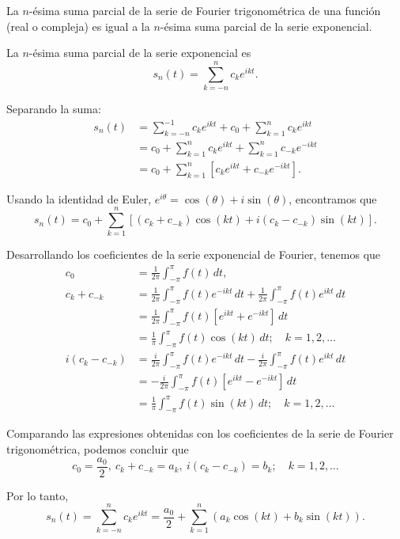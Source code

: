 \begin{propo} \label{TrigoExpo}
La $n$-ésima suma parcial de la serie de Fourier trigonométrica de una función (real o compleja) es igual a la $n$-ésima suma parcial de la serie exponencial.
\end{propo}

\begin{demo}
La $n$-ésima suma parcial de la serie exponencial es
$$ s_n(t) = \sum_{k=-n}^n c_k e^{ikt}.$$

Separando la suma:
\begin{align*}
    s_n(t) &= \sum_{k=-n}^{-1} c_k e^{ikt} + c_0 + \sum_{k=1}^n c_k e^{ikt} \\
    &= c_0 + \sum_{k=1}^n c_k e^{ikt} + \sum_{k=1}^n c_{-k} e^{-ikt} \\
    &= c_0 + \sum_{k=1}^n [c_k e^{ikt} + c_{-k} e^{-ikt}]. 
\end{align*}

Usando la identidad de Euler, $e^{i\theta} = \cos(\theta) + i \sin(\theta)$, encontramos que
$$s_n(t) = c_0 +  \sum_{k=1}^n [(c_k + c_{-k}) \cos(kt) + i(c_k - c_{-k}) \sin(kt)].$$

Desarrollando los coeficientes de la serie exponencial de Fourier, tenemos que
\begingroup
\allowdisplaybreaks
\begin{align*}
    c_0 &= \frac{1}{2\pi} \int_{-\pi}^{\pi} f(t) \,dt, \\
    c_k + c_{-k} &= \frac{1}{2\pi} \int_{-\pi}^{\pi} f(t) e^{-ikt} \,dt + \frac{1}{2\pi} \int_{-\pi}^{\pi} f(t) e^{ikt} \,dt  \\
    &= \frac{1}{2\pi} \int_{-\pi}^{\pi} f(t) [e^{ikt} + e^{-ikt}] \,dt \\
    &= \frac{1}{\pi} \int_{-\pi}^{\pi} f(t) \cos(kt) \,dt; \quad k = 1,2, \dots\\
   i( c_k - c_{-k}) &= \frac{i}{2\pi} \int_{-\pi}^{\pi} f(t) e^{-ikt} \,dt - \frac{i}{2\pi} \int_{-\pi}^{\pi} f(t) e^{ikt} \,dt \\
   &= - \frac{i}{2\pi} \int_{-\pi}^{\pi} f(t) [e^{ikt} - e^{-ikt}] \,dt \\
   &= \frac{1}{\pi} \int_{-\pi}^{\pi} f(t) \sin(kt)\,dt; \quad k = 1,2, \dots
\end{align*}
\endgroup

Comparando las expresiones obtenidas con los coeficientes de la serie de Fourier trigonométrica, podemos concluir que 
$$c_0 = \frac{a_0}{2}, ~  c_k + c_{-k} = a_k, ~ i( c_k - c_{-k}) = b_k; \quad k = 1,2, \dots$$

Por lo tanto, 
$$ s_n(t) = \sum_{k=-n}^n c_k e^{ikt} = \frac{a_0}{2} + \sum_{k=1}^n (a_k \cos(kt) + b_k \sin(kt)).$$

\end{demo}


